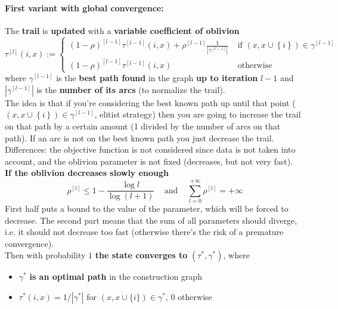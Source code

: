 \paragraph{First variant with global convergence:} The \textbf{trail} is \textbf{updated} with a \textbf{variable coefficient of oblivion}
$$ \tau^{[l]} (i, x) := 
\begin{cases}
	(1  -\rho)^{[l-1]} \tau^{[l-1]} (i,x) + \rho^{[l-1]} \frac{1}{|\gamma^{[l-1]}|} & \text{ if } (x, x \cup \left\{i\right\}) \in \gamma^{[l-1]} \\
	(1  -\rho)^{[l-1]} \tau^{[l-1]} (i,x) & \text{ otherwise }
\end{cases}
$$
where $\gamma^{[l−1]}$ is the \textbf{best path found} in the graph \textbf{up to iteration} $l - 1$ and $|\gamma^{[l−1]}|$ is the \textbf{number of its arcs} (to normalize the trail).\\

The idea is that if you're considering the best known path up until that point ($(x, x \cup \left\{i\right\}) \in \gamma^{[l-1]}$, elitist strategy) then you are going to increase the trail on that path by a certain amount (1 divided by the number of arcs on that path). If an arc is not on the best known path you just decrease the trail.\\

Differences: the objective function is not considered since data is not taken into account, and the oblivion parameter is not fixed (decreases, but not very fast).\\

\textbf{If the oblivion decreases slowly enough}
$$ \rho^{[l]} \leq 1 - \frac{\log l}{\log (l+1)} \;\;\; \text{ and } \;\;\; \sum_{l=0}^{+ \infty} \rho^{[l]} = + \infty $$
First half puts a bound to the value of the parameter, which will be forced to decrease. The second part means that the sum of all parameters should diverge, i.e. it should not decrease too fast (otherwise there's the risk of a premature convergence).\\

Then with probability $1$ \textbf{the state converges to} $(\tau^\ast, \gamma^\ast)$, where
\begin{itemize}
	\item $\gamma^\ast$ \textbf{is an optimal path} in the construction graph
	
	\item $\tau^\ast (i, x) = 1/|\gamma^\ast|$ for $(x, x \cup \{i\}) \in \gamma^\ast$, $0$ otherwise
\end{itemize}

